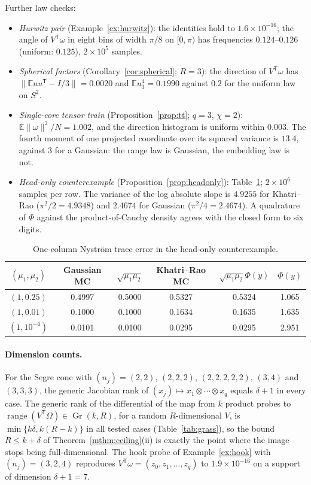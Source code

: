\documentclass[11pt,a4paper]{article}
\theoremstyle{definition}
\theoremstyle{remark}
\numberwithin{equation}{section}
\newcommand{\E}{\mathbb E}
\newcommand{\T}{{\mathsf T}}
\newcommand{\range}{\operatorname{range}}
\newcommand{\Gr}{\operatorname{Gr}}
\newcommand{\norm}[1]{\lVert#1\rVert}
\begin{document}
Further law checks:
\begin{itemize}
\item \emph{Hurwitz pair} (Example~\ref{ex:hurwitz}): the identities hold to
      $1.6\times10^{-16}$; the angle of $V^\T\omega$ in eight bins of width
$\pi/8$ on $[0,\pi)$ has frequencies $0.124$--$0.126$ (uniform: $0.125$), $2\times10^5$
      samples.
\item \emph{Spherical factors} (Corollary~\ref{cor:spherical}; $R=3$): the
      direction of $V^\T\omega$ has $\norm{\E uu^\T-I/3}=0.0020$ and
      $\E u_1^4=0.1990$ against $0.2$ for the uniform law on $S^2$.
\item \emph{Single-core tensor train} (Proposition~\ref{prop:tt}; $q=3$,
      $\chi=2$): $\E\norm\omega^2/N=1.002$, and the direction histogram is
      uniform within $0.003$. The fourth moment of one projected coordinate
      over its squared variance is $13.4$, against $3$ for a Gaussian: the range
      law is Gaussian, the embedding law is not.
\item \emph{Head-only counterexample} (Proposition~\ref{prop:headonly}):
      Table~\ref{tab:headonly}; $2\times10^6$ samples per row. The variance of the
      log absolute slope is $4.9255$ for Khatri--Rao ($\pi^2/2=4.9348$) and
      $2.4674$ for Gaussian ($\pi^2/4=2.4674$). A quadrature of $\Phi$ against the
      product-of-Cauchy density agrees with the closed form to six digits.
\end{itemize}

\begin{table}[htbp]
\centering\small
\begin{tabular}{@{}cccccc@{}}\toprule
$(\mu_1,\mu_2)$ & Gaussian MC & $\sqrt{\mu_1\mu_2}$ & Khatri--Rao MC &
$\sqrt{\mu_1\mu_2}\Phi(y)$ & $\Phi(y)$\\\midrule
$(1,0.25)$   & 0.4997 & 0.5000 & 0.5327 & 0.5324 & 1.065\\
$(1,0.01)$   & 0.1000 & 0.1000 & 0.1634 & 0.1635 & 1.635\\
$(1,10^{-4})$& 0.0101 & 0.0100 & 0.0295 & 0.0295 & 2.951\\\bottomrule
\end{tabular}
\caption{One-column Nystr\"om trace error in the head-only counterexample.}
\label{tab:headonly}
\end{table}

\paragraph{Dimension counts.} For the Segre cone with $(n_j)=(2,2)$, $(2,2,2)$,
$(2,2,2,2,2)$, $(3,4)$ and $(3,3,3)$, the generic Jacobian rank of
$(x_j)\mapsto x_1\otimes\cdots\otimes x_q$ equals $\delta+1$ in every case. The
generic rank of the differential of the map from $k$ product probes to
$\range(V^\T\Omega)\in\Gr(k,R)$, for a random $R$-dimensional $V$, is
$\min\{k\delta,k(R-k)\}$ in all tested cases (Table~\ref{tab:grass}), so the
bound $R\le k+\delta$ of Theorem~\ref{mthm:ceiling}(ii) is exactly the point where
the image stops being full-dimensional. The hook probe of
Example~\ref{ex:hook} with $(n_j)=(3,2,4)$ reproduces
$V^\T\omega=(z_0,z_1,\ldots,z_q)$ to $1.9\times10^{-16}$ on a support of dimension
$\delta+1=7$.
\end{document}
